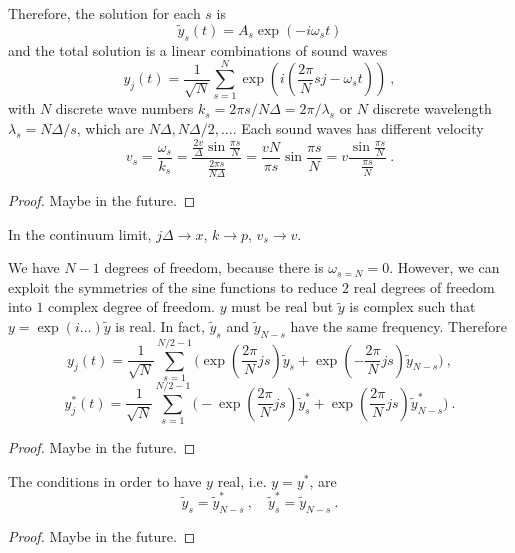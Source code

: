     Therefore, the solution for each $s$ is 
    \begin{equation*}
        \tilde y_s (t) = A_s \exp(- i \omega_s t) 
    \end{equation*}
    and the total solution is a linear combinations of sound waves 
    \begin{equation*}
        y_j (t) = \frac{1}{\sqrt{N}} \sum_{s = 1}^N \exp(i (\frac{2\pi}{N} s j - \omega_s t)) ~,
    \end{equation*}
    with $N$ discrete wave numbers $k_s = 2 \pi s / N \Delta = 2 \pi / \lambda_s$ or $N$ discrete wavelength $\lambda_s = N \Delta / s$, which are $N\Delta, N\Delta/2, \ldots$. Each sound waves has different velocity 
    \begin{equation*}
        v_s = \frac{\omega_s}{k_s} = \frac{\frac{2 v }{\Delta} \sin \frac{\pi s}{N}}{\frac{2 \pi s}{N \Delta}} = \frac{v N}{\pi s} \sin \frac{\pi s}{N} = v \frac{\sin \frac{\pi s}{N}}{\frac{\pi s}{N}} ~.
    \end{equation*}
    \begin{proof}
        Maybe in the future.
    \end{proof}

    In the continuum limit, $j \Delta \rightarrow x$, $k \rightarrow p$, $v_s \rightarrow v$.

    We have $N-1$ degrees of freedom, because there is $\omega_{s = N} = 0$. However, we can exploit the symmetries of the sine functions to reduce $2$ real degrees of freedom into $1$ complex degree of freedom. $y$ must be real but $\tilde y$ is complex such that $y = \exp(i \ldots) \tilde y$ is real. In fact, $\tilde y_s$ and $\tilde y_{N - s}$ have the same frequency. Therefore 
    \begin{equation*}
        y_j (t) = \frac{1}{\sqrt{N}} \sum_{s = 1}^{N/2 -1} \Big ( \exp(\frac{2\pi}{N} j s) \tilde y_s + \exp(- \frac{2\pi}{N} j s) \tilde y_{N - s} \Big) ~,
    \end{equation*}
    \begin{equation*}
        y_j^* (t) = \frac{1}{\sqrt{N}} \sum_{s = 1}^{N/2 -1} \Big (- \exp(\frac{2\pi}{N} j s) \tilde y_s^* + \exp(\frac{2\pi}{N} j s) \tilde y_{N - s}^* \Big) ~.
    \end{equation*}
    \begin{proof}
        Maybe in the future.
    \end{proof}
    The conditions in order to have $y$ real, i.e. $y = y^*$, are 
    \begin{equation*}
        \tilde y_s = \tilde y_{N-s}^* ~, \quad \tilde y_s^* = \tilde y_{N-s} ~.
    \end{equation*}
    \begin{proof}
        Maybe in the future.
    \end{proof}


